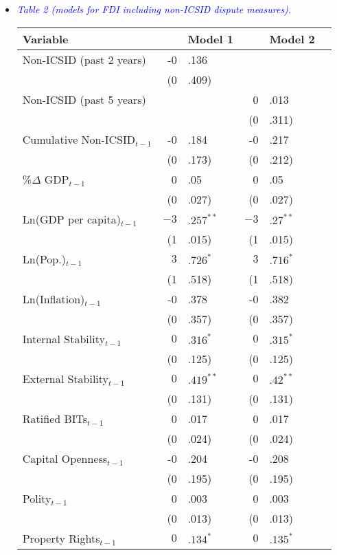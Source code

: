 \begin{enumerate}
\begin{itemize}
		\clearpage
		\item \textcolor{blue}{ \emph{ Table 2 (models for FDI including non-ICSID dispute measures). }}

			\begin{table}[ht]
			\centering
			\begingroup\footnotesize
			\begin{tabular}{lr@{} lr@{}lr@{}}
			 Variable && Model 1 && Model 2 \\ 
			  \hline
			\hline
			Non-ICSID (past 2 years) & -0&.136 &&  \\ 
			   & (0&.409) &&  \\ 
			  Non-ICSID (past 5 years) &  && 0&.013 \\ 
			   &  && (0&.311) \\ 
			  Cumulative Non-ICSID$_{t-1}$ & -0&.184 & -0&.217 \\ 
			   & (0&.173) & (0&.212) \\ 
			  \%$\Delta$ GDP$_{t-1}$ & 0&.05 & 0&.05 \\ 
			   & (0&.027) & (0&.027) \\ 
			  Ln(GDP per capita)$_{t-1}$ & $-3$&$.257^{\ast\ast}$ & $-3$&$.27^{\ast\ast}$ \\ 
			   & (1&.015) & (1&.015) \\ 
			  Ln(Pop.)$_{t-1}$ & $3$&$.726^{\ast}$ & $3$&$.716^{\ast}$ \\ 
			   & (1&.518) & (1&.518) \\ 
			  Ln(Inflation)$_{t-1}$ & -0&.378 & -0&.382 \\ 
			   & (0&.357) & (0&.357) \\ 
			  Internal Stability$_{t-1}$ & $0$&$.316^{\ast}$ & $0$&$.315^{\ast}$ \\ 
			   & (0&.125) & (0&.125) \\ 
			  External Stability$_{t-1}$ & $0$&$.419^{\ast\ast}$ & $0$&$.42^{\ast\ast}$ \\ 
			   & (0&.131) & (0&.131) \\ 
			  Ratified BITs$_{t-1}$ & 0&.017 & 0&.017 \\ 
			   & (0&.024) & (0&.024) \\ 
			  Capital Openness$_{t-1}$ & -0&.204 & -0&.208 \\ 
			   & (0&.195) & (0&.195) \\ 
			  Polity$_{t-1}$ & 0&.003 & 0&.003 \\ 
			   & (0&.013) & (0&.013) \\ 
			  Property Rights$_{t-1}$ & $0$&$.134^{\ast}$ & $0$&$.135^{\ast}$ \\ 

\end{tabular}
\end{table}
\end{itemize}
\end{enumerate}
